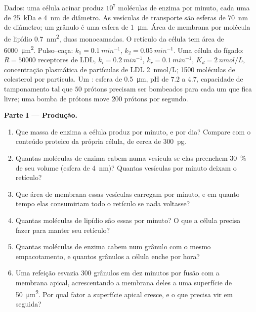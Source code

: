 \begin{problem}
\label{pb:b3:membrane-traffic:1}
Dados: uma célula acinar produz $10^{7}$ moléculas de enzima por
minuto, cada uma de \qty{25}{kDa} e \qty{4}{nm} de diâmetro. As
vesículas de transporte são esferas de \qty{70}{nm} de diâmetro; um
grânulo é uma esfera de \qty{1}{\micro m}. Área de membrana por
molécula de lipídio \qty{0.7}{nm^2}, duas monocamadas. O retículo da
célula tem área de \qty{6000}{\micro m^2}. Pulso--caça:
$k_{1} = \qty{0.1}{min^{-1}}$, $k_{2} = \qty{0.05}{min^{-1}}$. Uma
célula do fígado: $R = \num{50000}$ receptores de LDL,
$k_{i} = \qty{0.2}{min^{-1}}$, $k_{r} = \qty{0.1}{min^{-1}}$,
$K_{d} = \qty{2}{nmol/L}$, concentração plasmática de partículas de LDL
\qty{2}{nmol/L}; \num{1500} moléculas de colesterol por partícula.
Um : esfera de \qty{0.5}{\micro m}, pH de $7.2$ a $4.7$,
capacidade de tamponamento tal que $50$ prótons precisam ser bombeados
para cada um que fica livre; uma bomba de prótons move $200$ prótons
por segundo.

\medskip
\noindent\textbf{Parte I --- Produção.}
\begin{enumerate}
  \item Que massa de enzima a célula produz por minuto, e por dia?
        Compare com o conteúdo proteico da própria célula, de cerca de
        \qty{300}{pg}.
  \item Quantas moléculas de enzima cabem numa vesícula se elas
        preenchem \qty{30}{\%} de seu volume (esfera de \qty{4}{nm})?
        Quantas vesículas por minuto deixam o retículo?
  \item Que área de membrana essas vesículas carregam por minuto, e em
        quanto tempo elas consumiriam todo o retículo se nada
        voltasse?
  \item Quantas moléculas de lipídio são essas por minuto? O que a
        célula precisa fazer para manter seu retículo?
  \item Quantas moléculas de enzima cabem num grânulo com o mesmo
        empacotamento, e quantos grânulos a célula enche por hora?
  \item Uma refeição esvazia $300$ grânulos em dez minutos por fusão
        com a membrana apical, acrescentando a membrana deles a uma
        superfície de \qty{50}{\micro m^2}. Por qual fator a superfície
        apical cresce, e o que precisa vir em seguida?
\end{enumerate}


\end{problem}
